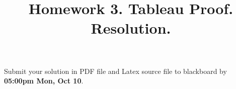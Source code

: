 \documentclass[12pt, letterpaper]{article}
\begin{document}
\newcommand{\ee}[1] {
  \begin{enumerate}
    #1
  \end{enumerate}
}
\newcommand{\ie}[1] {
  \begin{itemize}
    #1
  \end{itemize}
}

\newcommand{\hide}[1]{}
\newcommand{\set}[1]{\{#1\}}
\newcommand{\pg}[1]{{\tt #1}}
\newtheorem{definition}{Definition}

\newcommand{\emptyclause}{\Box}
\newcommand{\duedate}{
  05:00pm Mon, Oct 10}



\title{{\bf Homework 3}. Tableau Proof. Resolution.}
\date{}
\maketitle



\noindent Submit your solution in PDF file  and Latex source  file to blackboard by {\bf \duedate}.
\end{document}
